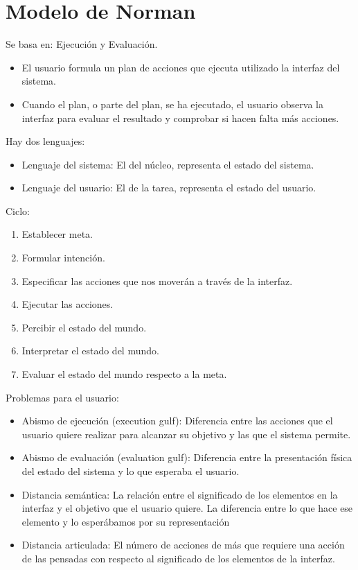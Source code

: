 \documentclass[12pt, twoside, openright]{report} %
\begin{document}
\section{Modelo de Norman}
\vspace{-0.5cm}
Se basa en: Ejecución y Evaluación.

\begin{itemize}
	\item El usuario formula un plan de acciones que ejecuta utilizado la
	      interfaz del sistema.
	\item Cuando el plan, o parte del plan, se ha ejecutado, el usuario
	      observa la interfaz para evaluar el resultado y comprobar si hacen
	      falta más acciones.
\end{itemize}
\pagebreak

Hay dos lenguajes:
\vspace{-0.5cm}

\begin{itemize}
	\item Lenguaje del sistema: El del núcleo, representa el estado del
	      sistema.
	\item Lenguaje del usuario: El de la tarea, representa el estado del
	      usuario.
\end{itemize}

Ciclo:
\vspace{-0.5cm}

\begin{enumerate}
	\def\labelenumi{\arabic{enumi}.}

	\item Establecer meta.
	\item Formular intención.
	\item Especificar las acciones que nos moverán a través de la interfaz.
	\item Ejecutar las acciones.
	\item Percibir el estado del mundo.
	\item Interpretar el estado del mundo.
	\item Evaluar el estado del mundo respecto a la meta.
\end{enumerate}

Problemas para el usuario:

\begin{itemize}
	\item Abismo de ejecución (execution gulf): Diferencia entre las
	      acciones que el usuario quiere realizar para alcanzar su objetivo
	      y las que el sistema permite.
	\item Abismo de evaluación (evaluation gulf): Diferencia entre la
	      presentación física del estado del sistema y lo que esperaba el
	      usuario.
	\item Distancia semántica: La relación entre el significado de los
	      elementos en la interfaz y el objetivo que el usuario quiere. La
	      diferencia entre lo que hace ese elemento y lo esperábamos por su
	      representación
	\item Distancia articulada: El número de acciones de más que requiere
	      una acción de las pensadas con respecto al significado de los
	      elementos de la interfaz.
\end{itemize}
\end{document}
